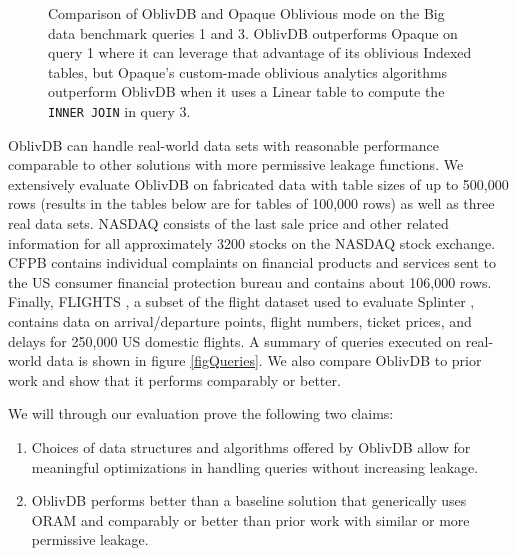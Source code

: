 \documentclass[USenglish,oneside,twocolumn]{article}
\def\name/{OblivDB}
\begin{document}
\begin{figure}
\caption{Comparison of \name/ and Opaque Oblivious mode on the Big data benchmark queries 1 and 3. \name/ outperforms Opaque on query 1 where it can leverage that advantage of its oblivious Indexed tables, but Opaque's custom-made oblivious analytics algorithms outperform \name/ when it uses a Linear table to compute the \texttt{INNER JOIN} in query 3.} 
\label{figOpaque}
\end{figure}
\name/ can handle real-world data sets with reasonable performance comparable to other solutions with more permissive leakage functions. We extensively evaluate \name/ on fabricated data with table sizes of up to 500,000 rows (results in the tables below are for tables of 100,000 rows) as well as three real data sets. NASDAQ \cite{NASDAQ} consists of the last sale price and other related information for all approximately 3200 stocks on the NASDAQ stock exchange. CFPB \cite{CFPB} contains individual complaints on financial products and services sent to the US consumer financial protection bureau and contains about 106,000 rows. Finally, FLIGHTS \cite{FLIGHT}, a subset of the flight dataset used to evaluate Splinter \cite{WYG+17}, contains data on arrival/departure points, flight numbers, ticket prices, and delays for 250,000 US domestic flights. A summary of queries executed on real-world data is shown in figure \ref{figQueries}. We also compare \name/ to prior work and show that it performs comparably or better. 

We will through our evaluation prove the following two claims: 

\begin{enumerate}
\item Choices of data structures and algorithms offered by \name/ allow for meaningful optimizations in handling queries without increasing leakage. 

\item \name/ performs better than a baseline solution that generically uses ORAM and comparably or better than prior work with similar or more permissive leakage.
\end{enumerate}
\end{document}
